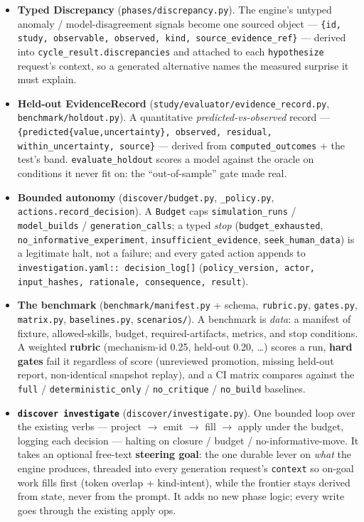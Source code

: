 \documentclass[11pt]{article}
\newcommand{\code}[1]{\texttt{\small #1}}
\begin{document}
\begin{itemize}
\item \textbf{Typed Discrepancy} (\code{phases/discrepancy.py}). The engine's untyped anomaly /
model-disagreement signals become one sourced object --- \code{\{id, study, observable, observed,
kind, source\_evidence\_ref\}} --- derived into \code{cycle\_result.discrepancies} and attached to
each \code{hypothesize} request's context, so a generated alternative names the measured surprise
it must explain.
\item \textbf{Held-out EvidenceRecord} (\code{study/evaluator/evidence\_record.py},
\code{benchmark/holdout.py}). A quantitative \emph{predicted-vs-observed} record ---
\code{\{predicted\{value,uncertainty\}, observed, residual, within\_uncertainty, source\}} ---
derived from \code{computed\_outcomes} + the test's band. \code{evaluate\_holdout} scores a model
against the oracle on conditions it never fit on: the ``out-of-sample'' gate made real.
\item \textbf{Bounded autonomy} (\code{discover/budget.py}, \code{\_policy.py},
\code{actions.record\_decision}). A \code{Budget} caps \code{simulation\_runs} /
\code{model\_builds} / \code{generation\_calls}; a typed \emph{stop} (\code{budget\_exhausted},
\code{no\_informative\_experiment}, \code{insufficient\_evidence}, \code{seek\_human\_data}) is a
legitimate halt, not a failure; and every gated action appends to \code{investigation.yaml::
decision\_log[]} (\code{policy\_version, actor, input\_hashes, rationale, consequence, result}).
\item \textbf{The benchmark} (\code{benchmark/manifest.py} + schema, \code{rubric.py},
\code{gates.py}, \code{matrix.py}, \code{baselines.py}, \code{scenarios/}). A benchmark is
\emph{data}: a manifest of fixture, allowed-skills, budget, required-artifacts, metrics, and stop
conditions. A weighted \textbf{rubric} (mechanism-id 0.25, held-out 0.20, \dots) scores a run,
\textbf{hard gates} fail it regardless of score (unreviewed promotion, missing held-out report,
non-identical snapshot replay), and a CI matrix compares against the \code{full} /
\code{deterministic\_only} / \code{no\_critique} / \code{no\_build} baselines.
\item \textbf{\code{discover investigate}} (\code{discover/investigate.py}). One bounded loop over
the existing verbs --- project $\rightarrow$ emit $\rightarrow$ fill $\rightarrow$ apply under the
budget, logging each decision --- halting on closure / budget / no-informative-move. It takes an
optional free-text \textbf{steering goal}: the one durable lever on \emph{what} the engine produces,
threaded into every generation request's \code{context} so on-goal work fills first (token overlap +
kind-intent), while the frontier stays derived from state, never from the prompt. It adds no new
phase logic; every write goes through the existing apply ops.
\end{itemize}
\end{document}
